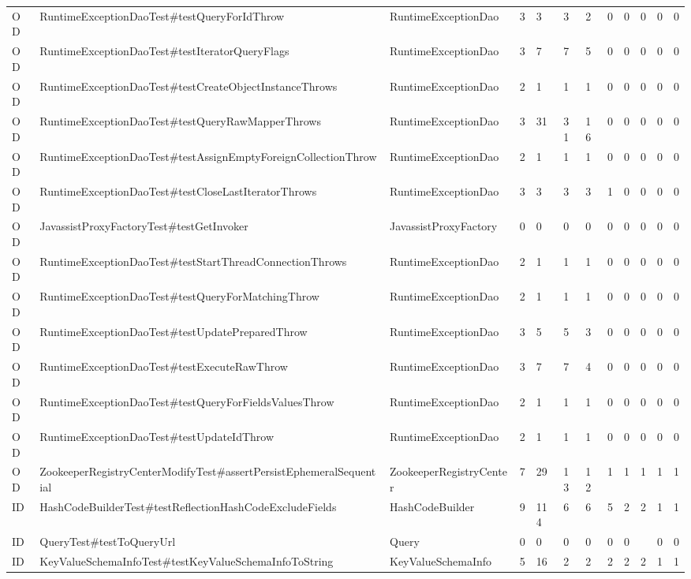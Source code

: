 \begin{table}[t]
\begin{tabular}{llllllllllll}
OD & RuntimeExceptionDaoTest\#testQueryForIdThrow & RuntimeExceptionDao & 3 & 3 & 3 & 2 & 0 & 0 & 0 & 0 & 0 \\
OD & RuntimeExceptionDaoTest\#testIteratorQueryFlags & RuntimeExceptionDao & 3 & 7 & 7 & 5 & 0 & 0 & 0 & 0 & 0 \\
OD & RuntimeExceptionDaoTest\#testCreateObjectInstanceThrows & RuntimeExceptionDao & 2 & 1 & 1 & 1 & 0 & 0 & 0 & 0 & 0 \\
OD & RuntimeExceptionDaoTest\#testQueryRawMapperThrows & RuntimeExceptionDao & 3 & 31 & 31 & 16 & 0 & 0 & 0 & 0 & 0 \\
OD & RuntimeExceptionDaoTest\#testAssignEmptyForeignCollectionThrow & RuntimeExceptionDao & 2 & 1 & 1 & 1 & 0 & 0 & 0 & 0 & 0 \\
OD & RuntimeExceptionDaoTest\#testCloseLastIteratorThrows & RuntimeExceptionDao & 3 & 3 & 3 & 3 & 1 & 0 & 0 & 0 & 0 \\
OD & JavassistProxyFactoryTest\#testGetInvoker & JavassistProxyFactory & 0 & 0 & 0 & 0 & 0 & 0 & 0 & 0 & 0 \\
OD & RuntimeExceptionDaoTest\#testStartThreadConnectionThrows & RuntimeExceptionDao & 2 & 1 & 1 & 1 & 0 & 0 & 0 & 0 & 0 \\
OD & RuntimeExceptionDaoTest\#testQueryForMatchingThrow & RuntimeExceptionDao & 2 & 1 & 1 & 1 & 0 & 0 & 0 & 0 & 0 \\
OD & RuntimeExceptionDaoTest\#testUpdatePreparedThrow & RuntimeExceptionDao & 3 & 5 & 5 & 3 & 0 & 0 & 0 & 0 & 0 \\
OD & RuntimeExceptionDaoTest\#testExecuteRawThrow & RuntimeExceptionDao & 3 & 7 & 7 & 4 & 0 & 0 & 0 & 0 & 0 \\
OD & RuntimeExceptionDaoTest\#testQueryForFieldsValuesThrow & RuntimeExceptionDao & 2 & 1 & 1 & 1 & 0 & 0 & 0 & 0 & 0 \\
OD & RuntimeExceptionDaoTest\#testUpdateIdThrow & RuntimeExceptionDao & 2 & 1 & 1 & 1 & 0 & 0 & 0 & 0 & 0 \\
OD & ZookeeperRegistryCenterModifyTest\#assertPersistEphemeralSequential & ZookeeperRegistryCenter & 7 & 29 & 13 & 12 & 1 & 1 & 1 & 1 & 1 \\
ID & HashCodeBuilderTest\#testReflectionHashCodeExcludeFields & HashCodeBuilder & 9 & 114 & 6 & 6 & 5 & 2 & 2 & 1 & 1 \\
ID & QueryTest\#testToQueryUrl & Query & 0 & 0 & 0 & 0 & 0 & 0 &  & 0 & 0 \\
ID & KeyValueSchemaInfoTest\#testKeyValueSchemaInfoToString & KeyValueSchemaInfo & 5 & 16 & 2 & 2 & 2 & 2 & 2 & 1 & 1 \\

\end{tabular}
\end{table}
